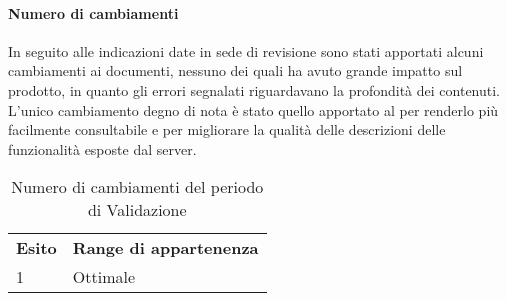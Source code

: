 \paragraph*{Numero di cambiamenti} 
In seguito alle indicazioni date in sede di revisione sono stati apportati alcuni cambiamenti ai documenti, nessuno dei quali ha avuto grande impatto sul prodotto, in quanto gli errori segnalati riguardavano la profondità dei contenuti. L'unico cambiamento degno di nota è stato quello apportato al \ManualeSviluppatore{} per renderlo più facilmente consultabile e per migliorare la qualità delle descrizioni delle funzionalità esposte dal server.  \\
\begin{table}[H]
\centering
\begin{tabular}{|l|l|}
\cline{1-2}
\textbf{Esito}  & \textbf{Range di appartenenza}  \\ \cline{1-2}
1 & Ottimale \\ \cline{1-2}
\end{tabular}
\caption{Numero di cambiamenti del periodo di Validazione}
\end{table}
